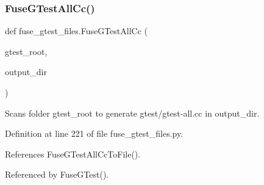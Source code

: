 \subsubsection{\texorpdfstring{Fuse\+G\+Test\+All\+Cc()}{FuseGTestAllCc()}}
{\footnotesize\ttfamily def fuse\+\_\+gtest\+\_\+files.\+Fuse\+G\+Test\+All\+Cc (\begin{DoxyParamCaption}\item[{}]{gtest\+\_\+root,  }\item[{}]{output\+\_\+dir }\end{DoxyParamCaption})}

\begin{DoxyVerb}Scans folder gtest_root to generate gtest/gtest-all.cc in output_dir.\end{DoxyVerb}
 

Definition at line 221 of file fuse\+\_\+gtest\+\_\+files.\+py.



References Fuse\+G\+Test\+All\+Cc\+To\+File().



Referenced by Fuse\+G\+Test().


